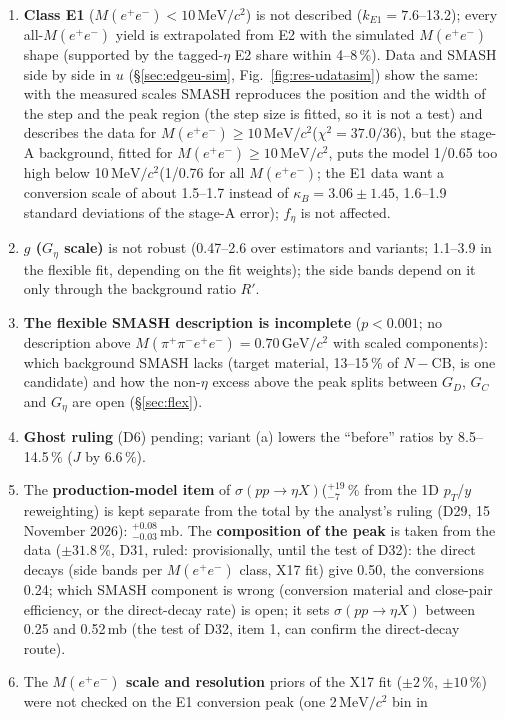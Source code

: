 \documentclass[11pt,a4paper]{article}
\newcommand{\Mfour}{\ensuremath{M(\pi^{+}\pi^{-}e^{+}e^{-})}\xspace}
\newcommand{\Mee}{\ensuremath{M(e^{+}e^{-})}\xspace}
\newcommand{\GeVcc}{\ensuremath{\mathrm{GeV}/c^{2}}\xspace}
\newcommand{\MeVcc}{\ensuremath{\mathrm{MeV}/c^{2}}\xspace}
\newcommand{\kB}{\ensuremath{\kappa_B}\xspace}
\newcommand{\kEone}{\ensuremath{k_{E1}}\xspace}
\newcommand{\sigeta}{\ensuremath{\sigma(pp\to\eta X)}\xspace}
\newcommand{\Geta}{\ensuremath{G_\eta}\xspace}
\begin{document}
\begin{enumerate}
      (\S\ref{sec:eff}).
\item \textbf{Class E1} (\Mee$<10$\,\MeVcc) is not described (\kEone$=7.6$--13.2); every all-\Mee yield is extrapolated from E2 with the simulated
      \Mee shape (supported by the tagged-$\eta$ E2 share within 4--8\,\%). Data and SMASH side by side in $u$ (\S\ref{sec:edgeu-sim},
      Fig.~\ref{fig:res-udatasim}) show the same: with the measured scales SMASH reproduces the position and the width of the step and the peak
      region (the step size is fitted, so it is not a test) and describes the data for \Mee$\ge10$\,\MeVcc ($\chi^2=37.0/36$), but the stage-A
      background, fitted for \Mee$\ge10$\,\MeVcc, puts the model 1/0.65 too high below 10\,\MeVcc (1/0.76 for all \Mee; the E1 data want a
      conversion scale of about 1.5--1.7 instead of $\kB=3.06\pm1.45$, 1.6--1.9 standard deviations of the stage-A error); $f_\eta$ is not affected.
\item \textbf{$g$ (\Geta scale)} is not robust (0.47--2.6 over estimators and variants; 1.1--3.9 in the flexible fit, depending on the fit
      weights); the side bands depend on it only through the background ratio $R'$.
\item \textbf{The flexible SMASH description is incomplete} ($p<0.001$; no description above \Mfour$=0.70$\,\GeVcc with scaled components): which
      background SMASH lacks (target material, 13--15\,\% of $N-\mathrm{CB}$, is one candidate) and how the non-$\eta$ excess above the peak splits
      between $G_D$, $G_C$ and \Geta are open (\S\ref{sec:flex}).
\item \textbf{Ghost ruling} (D6) pending; variant (a) lowers the ``before'' ratios by 8.5--14.5\,\% ($J$ by 6.6\,\%).
\item The \textbf{production-model item} of \sigeta ($^{+19}_{-7}$\,\% from the 1D $p_T$/$y$ reweighting) is kept separate from the total by
      the analyst's ruling (D29, 15 November 2026): $^{+0.08}_{-0.03}$\,mb. The \textbf{composition of the peak} is taken from the data
      ($\pm31.8$\,\%, D31, ruled: provisionally, until the test of D32): the direct decays
      (side bands per \Mee class, X17 fit) give 0.50, the conversions 0.24; which SMASH component is wrong (conversion material and close-pair
      efficiency, or the direct-decay rate) is open; it sets \sigeta between 0.25 and 0.52\,mb (the test of D32, item 1, can confirm the
      direct-decay route).
\item The \textbf{\Mee scale and resolution} priors of the X17 fit ($\pm2$\,\%, $\pm10$\,\%) were not checked on the E1 conversion peak (one 2\,\MeVcc bin in

\end{enumerate}
\end{document}
